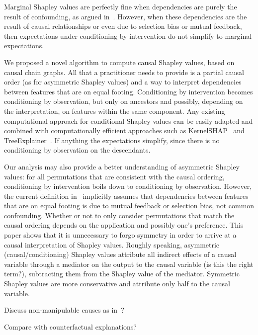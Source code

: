 \documentclass{article}
\newcommand{\comment}[1]{{\color{red} #1}}
\begin{document}
Marginal Shapley values are perfectly fine when dependencies are purely the result of confounding, as argued in~\cite{janzing2019feature}. However, when these dependencies are the result of causal relationships or even due to selection bias or mutual feedback, then expectations under conditioning by intervention do not simplify to marginal expectations.

We proposed a novel algorithm to compute causal Shapley values, based on causal chain graphs. All that a practitioner needs to provide is a partial causal order (as for asymmetric Shapley values) and a way to interpret dependencies between features that are on equal footing. Conditioning by intervention becomes conditioning by observation, but only on ancestors and possibly, depending on the interpretation, on features within the same component. Any existing computational approach for conditional Shapley values can be easily adapted and combined with computationally efficient approaches such as KernelSHAP~\cite{lundberg2017unified} and TreeExplainer~\cite{lundberg2020local}. If anything the expectations simplify, since there is no conditioning by observation on the descendants.

Our analysis may also provide a better understanding of asymmetric Shapley values: for all permutations that are consistent with the causal ordering, conditioning by intervention boils down to conditioning by observation. However, the current definition in~\cite{frye2019asymmetric} implicitly assumes that dependencies between features that are on equal footing is due to mutual feedback or selection bias, not common confounding. Whether or not to only consider permutations that match the causal ordering depends on the application and possibly one's preference. This paper shows that it is unnecessary to forgo symmetry in order to arrive at a causal interpretation of Shapley values. Roughly speaking, asymmetric (causal/conditioning) Shapley values attribute all indirect effects of a causal variable through a mediator on the output to the causal variable \comment{(is this the right term?)}, subtracting them from the Shapley value of the mediator. Symmetric Shapley values are more conservative and attribute only half to the causal variable.

\comment{Discuss non-manipulable causes as in~\cite{pearl2018obesity}?}
	


\comment{Compare with counterfactual explanations?}

%
\end{document}
